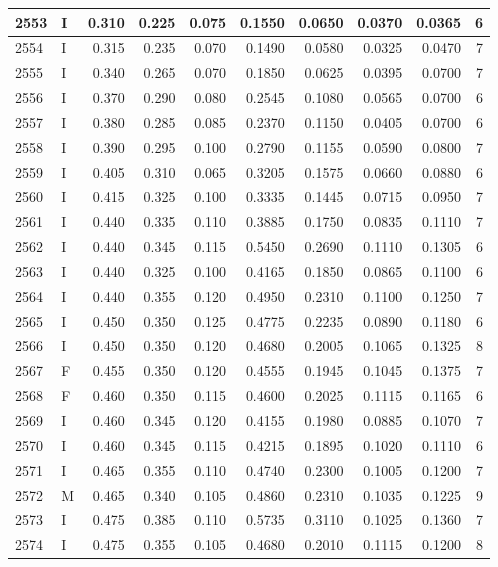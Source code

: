 \documentclass[9pt,twocolumn,twoside,]{pnas-new}
\begin{document}
\begin{tabular}{l|l|r|r|r|r|r|r|r|r}
\hline
2553 & I & 0.310 & 0.225 & 0.075 & 0.1550 & 0.0650 & 0.0370 & 0.0365 & 6\\
\hline
2554 & I & 0.315 & 0.235 & 0.070 & 0.1490 & 0.0580 & 0.0325 & 0.0470 & 7\\
\hline
2555 & I & 0.340 & 0.265 & 0.070 & 0.1850 & 0.0625 & 0.0395 & 0.0700 & 7\\
\hline
2556 & I & 0.370 & 0.290 & 0.080 & 0.2545 & 0.1080 & 0.0565 & 0.0700 & 6\\
\hline
2557 & I & 0.380 & 0.285 & 0.085 & 0.2370 & 0.1150 & 0.0405 & 0.0700 & 6\\
\hline
2558 & I & 0.390 & 0.295 & 0.100 & 0.2790 & 0.1155 & 0.0590 & 0.0800 & 7\\
\hline
2559 & I & 0.405 & 0.310 & 0.065 & 0.3205 & 0.1575 & 0.0660 & 0.0880 & 6\\
\hline
2560 & I & 0.415 & 0.325 & 0.100 & 0.3335 & 0.1445 & 0.0715 & 0.0950 & 7\\
\hline
2561 & I & 0.440 & 0.335 & 0.110 & 0.3885 & 0.1750 & 0.0835 & 0.1110 & 7\\
\hline
2562 & I & 0.440 & 0.345 & 0.115 & 0.5450 & 0.2690 & 0.1110 & 0.1305 & 6\\
\hline
2563 & I & 0.440 & 0.325 & 0.100 & 0.4165 & 0.1850 & 0.0865 & 0.1100 & 6\\
\hline
2564 & I & 0.440 & 0.355 & 0.120 & 0.4950 & 0.2310 & 0.1100 & 0.1250 & 7\\
\hline
2565 & I & 0.450 & 0.350 & 0.125 & 0.4775 & 0.2235 & 0.0890 & 0.1180 & 6\\
\hline
2566 & I & 0.450 & 0.350 & 0.120 & 0.4680 & 0.2005 & 0.1065 & 0.1325 & 8\\
\hline
2567 & F & 0.455 & 0.350 & 0.120 & 0.4555 & 0.1945 & 0.1045 & 0.1375 & 7\\
\hline
2568 & F & 0.460 & 0.350 & 0.115 & 0.4600 & 0.2025 & 0.1115 & 0.1165 & 6\\
\hline
2569 & I & 0.460 & 0.345 & 0.120 & 0.4155 & 0.1980 & 0.0885 & 0.1070 & 7\\
\hline
2570 & I & 0.460 & 0.345 & 0.115 & 0.4215 & 0.1895 & 0.1020 & 0.1110 & 6\\
\hline
2571 & I & 0.465 & 0.355 & 0.110 & 0.4740 & 0.2300 & 0.1005 & 0.1200 & 7\\
\hline
2572 & M & 0.465 & 0.340 & 0.105 & 0.4860 & 0.2310 & 0.1035 & 0.1225 & 9\\
\hline
2573 & I & 0.475 & 0.385 & 0.110 & 0.5735 & 0.3110 & 0.1025 & 0.1360 & 7\\
\hline
2574 & I & 0.475 & 0.355 & 0.105 & 0.4680 & 0.2010 & 0.1115 & 0.1200 & 8\\

\end{tabular}
\end{document}
